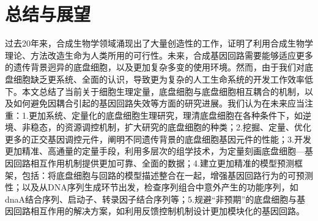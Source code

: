 \documentclass[b5paper,9pt,oneolumn,twoside,UTF8]{article}
\begin{document}
\section{总结与展望}
过去20年来，合成生物学领域涌现出了大量创造性的工作，证明了利用合成生物学理论、方法改造生命为人类所用的可行性。未来，合成基因回路需要能够适应更多的遗传背景迥异的底盘细胞，以及更加复杂多变的使用环境。然而，由于我们对底盘细胞缺乏更系统、全面的认识，导致更为复杂的人工生命系统的开发工作效率低下。本文总结了当前关于细胞生理定量，底盘细胞与底盘细胞相互耦合的机制，以及如何避免因耦合引起的基因回路失效等方面的研究进展。我们认为在未来应当注重：1.更加系统、定量化的底盘细胞生理研究，理清底盘细胞在各种条件下，如逆境、非稳态，的资源调控机制，扩大研究的底盘细胞的种类；2.挖掘、定量、优化更多的正交基因调控元件，阐明不同遗传背景的底盘细胞基因元件的性能；3.开发更加精准、高通量的定量手段，利用多层次的组学技术，为定量刻画底盘细胞---基因回路相互作用机制提供更加可靠、全面的数据；4.建立更加精准的模型预测框架，包括：将底盘细胞与回路的模型描述整合在一起，增强基因回路行为的可预测性；以及从DNA序列生成环节出发，检查序列组合中意外产生的功能序列，如dnaA结合序列、启动子、转录因子结合序列等；5.规避“非预期”的底盘细胞与基因回路相互作用的解决方案，如利用反馈控制机制设计更加模块化的基因回路。
\newpage
\end{document}
